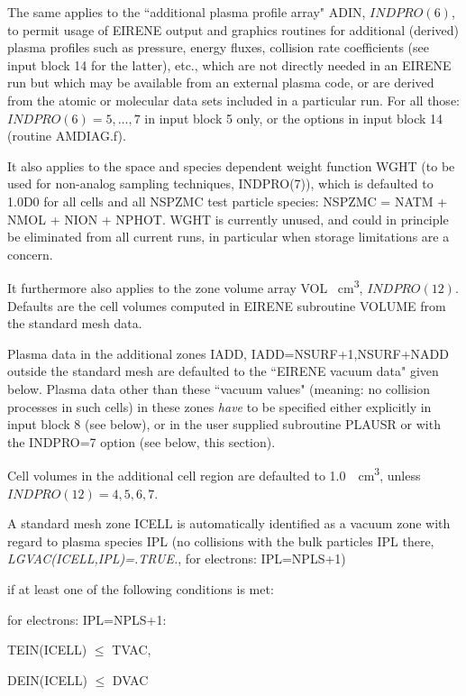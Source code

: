 \medskip

The same applies to the ``additional plasma profile array" ADIN, $INDPRO(6)$,
to permit usage of EIRENE output and graphics routines for additional (derived)
plasma profiles such as pressure, energy fluxes, collision rate coefficients
(see input block 14 for the latter), etc., which are not directly needed in an
EIRENE run but which may be available from an external plasma code, or are
derived from the atomic or molecular data sets included in a particular run.
For all those: $INDPRO(6) = 5, \dots, 7$ in input block 5 only, or the options
in input block 14 (routine AMDIAG.f).

It also applies to the space and species dependent weight function WGHT (to be
used for non-analog sampling techniques, INDPRO(7)), which is defaulted to
1.0D0 for all cells and all NSPZMC test particle species:
NSPZMC = NATM + NMOL + NION + NPHOT.
WGHT is currently unused, and could in principle be eliminated from all current
runs, in particular when storage limitations are a concern.

It furthermore also applies to the zone volume array VOL
\si{\per\cubic\centi\metre}, $INDPRO(12)$.
Defaults are the cell volumes computed in EIRENE subroutine VOLUME from the
standard mesh data.

Plasma data in the additional zones IADD, IADD=NSURF+1,NSURF+NADD outside the
standard mesh are defaulted to the ``EIRENE vacuum data" given below.
Plasma data other than these ``vacuum values" (meaning: no collision processes
in such cells) in these zones \textsl{have} to be specified either explicitly
in input block 8 (see below), or in the user supplied subroutine PLAUSR or with
the INDPRO=7 option (see below, this section).

Cell volumes in the additional cell region are defaulted to
\SI{1.0}{\per\cubic\centi\metre}, unless $INDPRO(12)=4, 5, 6, 7$.

A standard mesh zone ICELL is automatically identified as a vacuum zone with
regard to plasma species IPL (no collisions with the bulk particles IPL there,
\emph{LGVAC(ICELL,IPL)=.TRUE.}, for electrons: IPL=NPLS+1)

if at least one of the following conditions is met:

for electrons: IPL=NPLS+1:

TEIN(ICELL) $\le$ TVAC, 

DEIN(ICELL) $\le$ DVAC 

